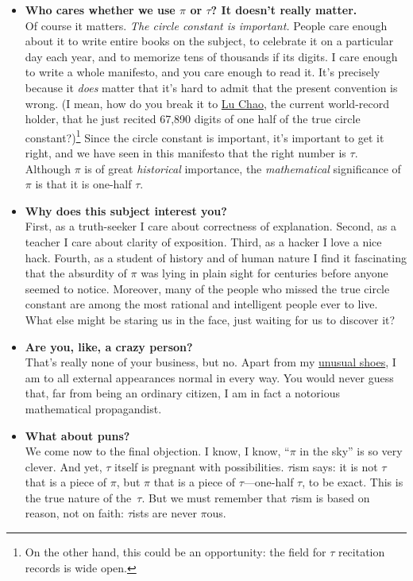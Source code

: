 \documentclass{article}
\begin{document}
\begin{itemize}
  \item \textbf{Who cares whether we use $\pi$ or $\tau$? It doesn't really matter.} \\ Of course it matters. \emph{The circle constant is important.} People care enough about it to write entire books on the subject, to celebrate it on a particular day each year, and to memorize tens of thousands if its digits. I care enough to write a whole manifesto, and you care enough to read it. It's precisely because it \emph{does} matter that it's hard to admit that the present convention is wrong. (I mean, how do you break it to \href{http://en.wikipedia.org/wiki/Lu_Chao}{Lu Chao}, the current world-record holder, that he just recited 67,890 digits of one half of the true circle constant?)\footnote{On the other hand, this could be an opportunity: the field for $\tau$ recitation records is wide open.} Since the circle constant is important, it's important to get it right, and we have seen in this manifesto that the right number is $\tau$. Although $\pi$ is of great \emph{historical} importance, the \emph{mathematical} significance of $\pi$ is that it is one-half $\tau$. 

  \item \textbf{Why does this subject interest you?} \\ First, as a truth-seeker I care about correctness of explanation. Second, as a teacher I care about clarity of exposition. Third, as a hacker I love a nice hack. Fourth, as a student of history and of human nature I find it fascinating that the absurdity of $\pi$ was lying in plain sight for centuries before anyone seemed to notice. Moreover, many of the people who missed the true circle constant are among the most rational and intelligent people ever to live. What else might be staring us in the face, just waiting for us to discover it?

  \item \textbf{Are you, like, a crazy person?} \\ That's really none of your business, but no. Apart from my \href{http://www.vibramfivefingers.com/}{unusual shoes}, I am to all external appearances normal in every way. You would never guess that, far from being an ordinary citizen, I am in fact a notorious mathematical propagandist.
  
  \item \textbf{What about puns?} \\ We come now to the final objection. I know, I know, ``$\pi$ in the sky'' is so very clever. And yet, $\tau$ itself is pregnant with possibilities. $\tau$ism says: it is not $\tau$ that is a piece of $\pi$, but $\pi$ that is a piece of $\tau$---one-half $\tau$, to be exact. This is the true nature of the~$\tau$. But we must remember that $\tau$ism is based on reason, not on faith: $\tau$ists are never $\pi$ous.

\end{itemize}
\end{document}
